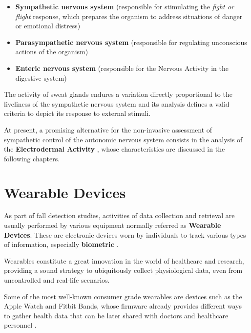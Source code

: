 \begin{itemize}
    \item \textbf{Sympathetic nervous system} (responsible for stimulating the \textit{fight or flight} response, which prepares the organism to address situations of danger or emotional distress)
    \item \textbf{Parasympathetic nervous system} (responsible for regulating unconscious actions of the organism)
    \item \textbf{Enteric nervous system} (responsible for the Nervous Activity in the digestive system)
\end{itemize}

The activity of sweat glands endures a variation directly proportional to the liveliness of the sympathetic nervous system and its analysis defines a valid criteria to depict its response to external stimuli.

At present, a promising alternative for the non-invasive assessment of sympathetic control of the autonomic nervous system consists in the analysis of the \textbf{Electrodermal Activity} \cite{edaIntro1}, whose characteristics are discussed in the following chapters.

\section{Wearable Devices}\label{sec:wearables}


As part of fall detection studies, activities of data collection and retrieval are usually performed by various equipment normally referred as \textbf{Wearable Devices}. These are electronic devices worn by individuals to track various types of information, especially \textbf{biometric} \cite{wearablesDefinition}.

Wearables constitute a great innovation in the world of healthcare and research, providing a sound strategy to ubiquitously collect physiological data, even from uncontrolled and real-life scenarios.

Some of the most well-known consumer grade wearables are devices such as the Apple Watch and Fitbit Bands, whose firmware already provides different ways to gather health data that can be later shared with doctors and healthcare personnel \cite{wearablesBest}. 

